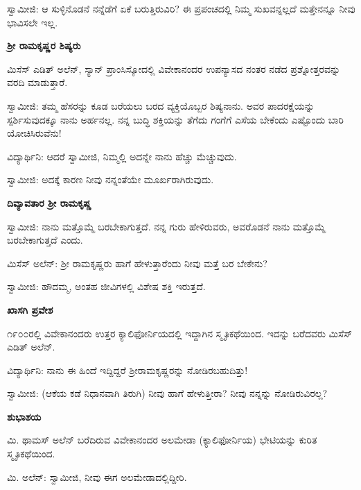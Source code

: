 ಸ್ವಾಮೀಜಿ: ಆ ಸುಳ್ಳಿನೊಡನೆ ನನ್ನೆಡೆಗೆ ಏಕೆ ಬರುತ್ತಿರುವಿರಿ? ಈ ಪ್ರಪಂಚದಲ್ಲಿ ನಿಮ್ಮ ಸುಖವನ್ನಲ್ಲದೆ ಮತ್ತೇನನ್ನೂ ನೀವು ಭಾವಿಸಲೇ ಇಲ್ಲ.

\begin{center}
\textbf{ಶ‍್ರೀ ರಾಮಕೃಷ್ಣರ ಶಿಷ್ಯರು}
\end{center}

ಮಿಸೆಸ್ ಎಡಿತ್ ಅಲೆನ್, ಸ್ಯಾನ್ ಪ್ರಾಂಸಿಸ್ಕೋದಲ್ಲಿ ವಿವೇಕಾನಂದರ ಉಪನ್ಯಾಸದ ನಂತರ ನಡೆದ ಪ್ರಶ್ನೋತ್ತರವನ್ನು ವರದಿ ಮಾಡುತ್ತಾರೆ.

ಸ್ವಾಮೀಜಿ: ತಮ್ಮ ಹೆಸರನ್ನು ಕೂಡ ಬರೆಯಲು ಬರದ ವ್ಯಕ್ತಿಯೊಬ್ಬರ ಶಿಷ್ಯನಾನು. ಅವರ ಪಾದರಕ್ಷೆಯನ್ನು ಸ್ಪರ್ಶಿಸುವುದಕ್ಕೂ ನಾನು ಅರ್ಹನಲ್ಲ. ನನ್ನ ಬುದ್ಧಿ ಶಕ್ತಿಯನ್ನು ತೆಗೆದು ಗಂಗೆಗೆ ಎಸೆಯ ಬೇಕೆಂದು ಎಷ್ಟೊಂದು ಬಾರಿ ಯೋಚಿಸಿರುವೆನು!

ವಿದ್ಯಾರ್ಥಿನಿ: ಆದರೆ ಸ್ವಾಮೀಜಿ, ನಿಮ್ಮಲ್ಲಿ ಅದನ್ನೇ ನಾನು ಹೆಚ್ಚು ಮೆಚ್ಚುವುದು.

ಸ್ವಾಮೀಜಿ: ಅದಕ್ಕೆ ಕಾರಣ ನೀವು ನನ್ನಂತೆಯೇ ಮೂರ್ಖರಾಗಿರುವುದು.

\begin{center}
\textbf{ದಿವ್ಯಾವತಾರ ಶ‍್ರೀ ರಾಮಕೃಷ್ಣ}
\end{center}

ಸ್ವಾಮೀಜಿ: ನಾನು ಮತ್ತೊಮ್ಮೆ ಬರಬೇಕಾಗುತ್ತದೆ. ನನ್ನ ಗುರು ಹೇಳಿರುವರು, ಅವರೊಡನೆ ನಾನು ಮತ್ತೊಮ್ಮೆ ಬರಬೇಕಾಗುತ್ತದೆ ಎಂದು.

ಮಿಸೆಸ್ ಅಲೆನ್: ಶ‍್ರೀ ರಾಮಕೃಷ್ಣರು ಹಾಗೆ ಹೇಳುತ್ತಾರೆಂದು ನೀವು ಮತ್ತೆ ಬರ ಬೇಕೇನು?

ಸ್ವಾಮೀಜಿ: ಹೌದಮ್ಮ, ಅಂತಹ ಜೀವಿಗಳಲ್ಲಿ ವಿಶೇಷ ಶಕ್ತಿ ಇರುತ್ತದೆ.

\begin{center}
\textbf{ಖಾಸಗಿ ಪ್ರವೇಶ}
\end{center}

೧೯೦೦ರಲ್ಲಿ ವಿವೇಕಾನಂದರು ಉತ್ತರ ಕ್ಯಾಲಿಫೋರ್ನಿಯದಲ್ಲಿ ಇದ್ದಾಗಿನ ಸ್ಮೃತಿಕಥೆಯಿಂದ. ಇದನ್ನು ಬರೆದವರು ಮಿಸೆಸ್ ಎಡಿತ್ ಅಲೆನ್.

ವಿದ್ಯಾರ್ಥಿನಿ: ನಾನು ಈ ಹಿಂದೆ ಇದ್ದಿದ್ದರೆ ಶ‍್ರೀರಾಮಕೃಷ್ಣರನ್ನು ನೋಡಿರಬಹುದಿತ್ತು!

ಸ್ವಾಮೀಜಿ: (ಆಕೆಯ ಕಡೆ ನಿಧಾನವಾಗಿ ತಿರುಗಿ) ನೀವು ಹಾಗೆ ಹೇಳುತ್ತೀರಾ? ನೀವು ನನ್ನನ್ನು ನೋಡಿರುವಿರಲ್ಲ?

\begin{center}
\textbf{ಶುಭಾಶಯ}
\end{center}

ಮಿ. ಥಾಮಸ್ ಅಲೆನ್ ಬರೆದಿರುವ ವಿವೇಕಾನಂದರ ಅಲಮೇಡಾ (ಕ್ಯಾಲಿಫೋರ್ನಿಯ) ಭೇಟಿಯನ್ನು ಕುರಿತ ಸ್ಮೃತಿಕಥೆಯಿಂದ.

ಮಿ. ಅಲೆನ್: ಸ್ವಾಮೀಜಿ, ನೀವು ಈಗ ಅಲಮೇಡಾದಲ್ಲಿದ್ದೀರಿ.

